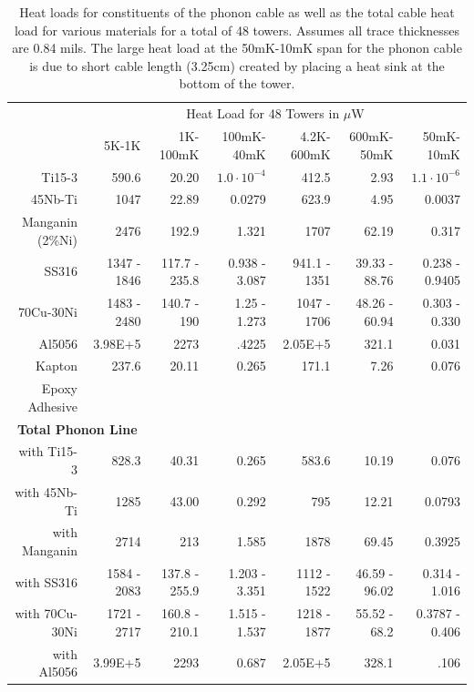\documentclass{article}
\begin{document}
\begin{table}[h]
\begin{threeparttable}
\begin{tabular}{rrrr|rrr}
\toprule
 & \multicolumn{6}{c}{Heat Load for 48 Towers in $\mu$W} \\
  & 5K-1K & 1K-100mK & 100mK-40mK & 4.2K-600mK & 600mK-50mK & 50mK-10mK \\
 \cmidrule(r){2-7}
   Ti15-3 \cite{wik} & 590.6 & 20.20 & $1.0\cdot10^{-4}$ & 412.5 & 2.93 & $1.1 \cdot 10^{-6}$ \\
   45Nb-Ti \cite{ols} & 1047 & 22.89 & 0.0279 & 623.9 & 4.95 & 0.0037 \\
   Manganin (2\%Ni) \cite{Peroni1999} & 2476 & 192.9 & 1.321 & 1707 & 62.19 & 0.317 \\
   SS316 \cite{lou} \cite{Barucci2008} & 1347 - 1846  & 117.7 - 235.8 & 0.938 - 3.087 & 941.1 - 1351 & 39.33 - 88.76 & 0.238 - 0.9405 \\
   70Cu-30Ni \cite{pob} \cite{ols} & 1483 - 2480 & 140.7 - 190 & 1.25 - 1.273 & 1047 - 1706 & 48.26 - 60.94 & 0.303 - 0.330 \\
   Al5056 \cite{Coccia1983} & 3.98E+5 & 2273 & .4225 & 2.05E+5 & 321.1 & 0.031 \\
   Kapton \cite{bar} & 237.6 & 20.11 & 0.265 & 171.1 & 7.26 & 0.076 \\
   Epoxy Adhesive &&&&&& \\
   \multicolumn{2}{c}{\bf{Total Phonon Line}} & & & & & \\
   with Ti15-3 & 828.3 & 40.31 & 0.265 & 583.6 & 10.19 & 0.076 \\
   with 45Nb-Ti & 1285 & 43.00 & 0.292 & 795 & 12.21 & 0.0793 \\
   with Manganin & 2714 & 213 & 1.585 & 1878 & 69.45 & 0.3925 \\
   with SS316 & 1584 - 2083 & 137.8 - 255.9 & 1.203 - 3.351 & 1112 - 1522 & 46.59 - 96.02 & 0.314 - 1.016 \\
   with 70Cu-30Ni & 1721 - 2717 & 160.8 - 210.1 & 1.515 - 1.537 & 1218 - 1877 & 55.52 - 68.2 & 0.3787 - 0.406 \\
   with Al5056 & 3.99E+5 & 2293 & 0.687 & 2.05E+5 & 328.1 & .106 \\
  \bottomrule
\end{tabular}
\end{threeparttable}
\caption{Heat loads for constituents of the phonon cable as well as the total cable heat load for various materials for a total of 48 towers. Assumes all trace thicknesses are 0.84 mils. The large heat load at the 50mK-10mK span for the phonon cable is due to short cable length (3.25cm) created by placing a heat sink at the bottom of the tower.}
\end{table}
\end{document}
